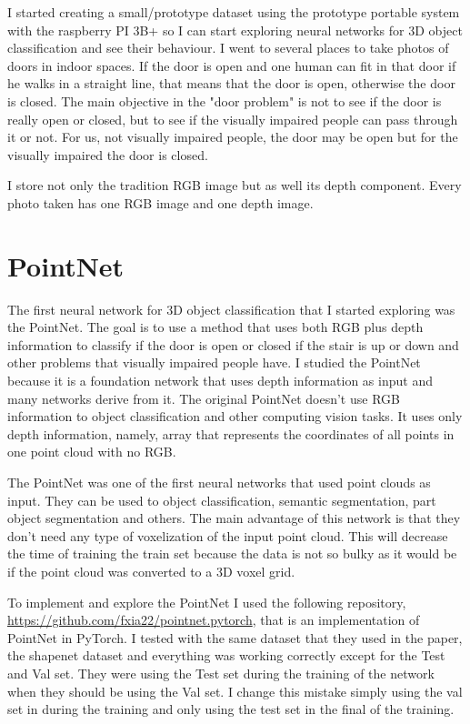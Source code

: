     I started creating a small/prototype dataset using the prototype portable system with the raspberry PI 3B+ so I can start exploring neural networks for 3D object classification and see their behaviour. I went to several places to take photos of doors in indoor spaces. If the door is open and one human can fit in that door if he walks in a straight line, that means that the door is open, otherwise the door is closed. The main objective in the "door problem" is not to see if the door is really open or closed, but to see if the visually impaired people can pass through it or not. For us, not visually impaired people, the door may be open but for the visually impaired the door is closed.
    
    I store not only the tradition RGB image but as well its depth component. Every photo taken has one RGB image and one depth image.
    
        
    \section{PointNet}
    
    The first neural network for 3D object classification that I started exploring was the PointNet. The goal is to use a method that uses both RGB plus depth information to classify if the door is open or closed if the stair is up or down and other problems that visually impaired people have. I studied the PointNet because it is a foundation network that uses depth information as input and many networks derive from it. The original PointNet doesn't use RGB information to object classification and other computing vision tasks. It uses only depth information, namely, array that represents the coordinates of all points in one point cloud with no RGB. 
    
    The PointNet was one of the first neural networks that used point clouds as input. They can be used to object classification, semantic segmentation, part object segmentation and others. The main advantage of this network is that they don't need any type of voxelization of the input point cloud. This will decrease the time of training the train set because the data is not so bulky as it would be if the point cloud was converted to a 3D voxel grid.
    
    To implement and explore the PointNet I used the following repository, \url{ https://github.com/fxia22/pointnet.pytorch}, that is an implementation of PointNet in PyTorch. I tested with the same dataset that they used in the paper, the shapenet dataset and everything was working correctly except for the Test and Val set. They were using the Test set during the training of the network when they should be using the Val set. I change this mistake simply using the val set in during the training and only using the test set in the final of the training.
    
